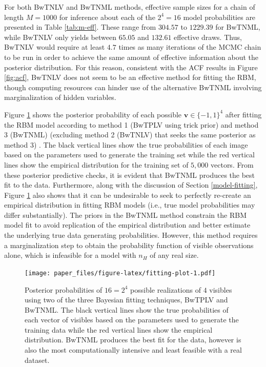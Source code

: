 \documentclass[12pt]{article}
\theoremstyle{definition}
\newcommand{\nh}{{n_{\scriptscriptstyle H}}}
\begin{document}
For both BwTNLV and BwTNML methods, effective sample sizes for a chain
of length \(M = 1000\) for inference about each of the \(2^4 = 16\)
model probabilities are presented in Table \ref{tab:m-eff}. These range
from \(304.57\) to \(1229.39\) for BwTNML, while BwTNLV only yields
between \(65.05\) and \(132.61\) effective draws. Thus, BwTNLV would
require at least \(4.7\) times as many iterations of the MCMC chain to
be run in order to achieve the same amount of effective information
about the posterior distribution. For this reason, consistent with the
ACF results in Figure \ref{fig:acf}, BwTNLV does not seem to be an
effective method for fitting the RBM, though computing resources can
hinder use of the alternative BwTNML involving marginalization of hidden
variables.

Figure \ref{fig:fitting-plot} shows the posterior probability of each
possible \(\boldsymbol v \in \{-1,1\}^4\) after fitting the RBM model
according to method 1 (BwTPLV using trick prior) and method 3 (BwTNML)
(excluding method 2 (BwTNLV) that seeks the same posterior as method 3)
. The black vertical lines show the true probabilities of each image
based on the parameters used to generate the training set while the red
vertical lines show the empirical distribution for the training set of
\(5,000\) vectors. From these posterior predictive checks, it is evident
that BwTNML produces the best fit to the data. Furthermore, along with
the discussion of Section \ref{model-fitting}, Figure
\ref{fig:fitting-plot} also shows that it can be undesirable to seek to
perfectly re-create an empirical distribution in fitting RBM models
(i.e., true model probabilities may differ substantially). The priors in
the BwTNML method constrain the RBM model fit to avoid replication of
the empirical distribution and better estimate the underlying true data
generating probabilities. However, this method requires a
marginalization step to obtain the probability function of visible
observations alone, which is infeasible for a model with \(\nh\) of any
real size. \par
\begin{figure}
\centering
\texttt{[image: paper\_files/figure-latex/fitting-plot-1.pdf]}
\caption{\label{fig:fitting-plot}Posterior probabilities of \(16 = 2^4\)
possible realizations of \(4\) visibles using two of the three Bayesian
fitting techniques, BwTPLV and BwTNML. The black vertical lines show the
true probabilities of each vector of visibles based on the parameters
used to generate the training data while the red vertical lines show the
empirical distribution. BwTNML produces the best fit for the data,
however is also the most computationally intensive and least feasible
with a real dataset.}
\end{figure}
\end{document}
